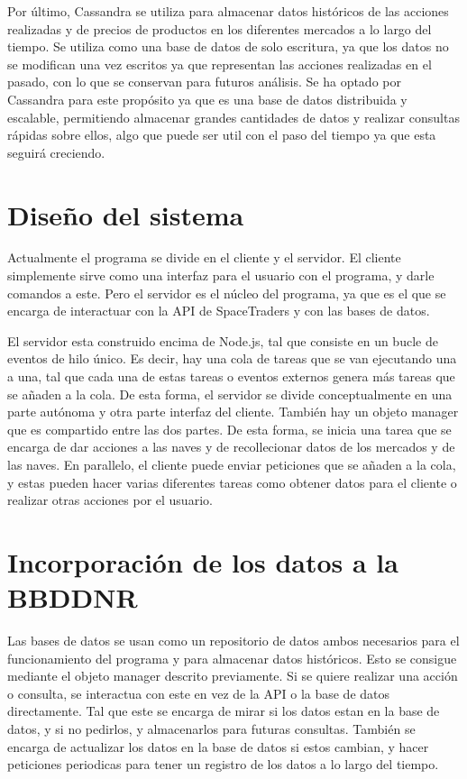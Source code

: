 \documentclass[spanish]{article}
\begin{document}
Por último, Cassandra se utiliza para almacenar datos históricos de las acciones realizadas y
de precios de productos en los diferentes mercados a lo largo del tiempo.
Se utiliza como una base de datos de solo escritura, ya que los datos no se modifican una vez escritos
ya que representan las acciones realizadas en el pasado, con lo que se conservan para futuros análisis.
Se ha optado por Cassandra para este propósito ya que es una base de datos distribuida y escalable,
permitiendo almacenar grandes cantidades de datos y realizar consultas rápidas sobre ellos,
algo que puede ser util con el paso del tiempo ya que esta seguirá creciendo.

\section{Diseño del sistema}

Actualmente el programa se divide en el cliente y el servidor.
El cliente simplemente sirve como una interfaz para el usuario con el programa,
y darle comandos a este.
Pero el servidor es el núcleo del programa, ya que es el que 
se encarga de interactuar con la API de SpaceTraders y con las bases de datos.

El servidor esta construido encima de Node.js,
tal que consiste en un bucle de eventos de hilo único.
Es decir, hay una cola de tareas que se van ejecutando una a una,
tal que cada una de estas tareas o eventos externos genera más tareas que se añaden a la cola.
De esta forma, el servidor se divide conceptualmente en
una parte autónoma y otra parte interfaz del cliente.
También hay un objeto manager que es compartido entre las dos partes.
De esta forma, se inicia una tarea que se encarga de dar acciones a las naves
y de recollecionar datos de los mercados y de las naves.
En parallelo, el cliente puede enviar peticiones que se añaden a la cola,
y estas pueden hacer varias diferentes tareas como obtener datos para el cliente
o realizar otras acciones por el usuario.

\section{Incorporación de los datos a la BBDDNR}

Las bases de datos se usan como un repositorio de datos ambos necesarios para
el funcionamiento del programa y para almacenar datos históricos.
Esto se consigue mediante el objeto manager descrito previamente.
Si se quiere realizar una acción o consulta,
se interactua con este en vez de la API o la base de datos directamente.
Tal que este se encarga de mirar si los datos estan en la base de datos, y si no
pedirlos, y almacenarlos para futuras consultas.
También se encarga de actualizar los datos en la base de datos si estos cambian, y
hacer peticiones periodicas para tener un registro de los datos a lo largo del tiempo.
\end{document}
